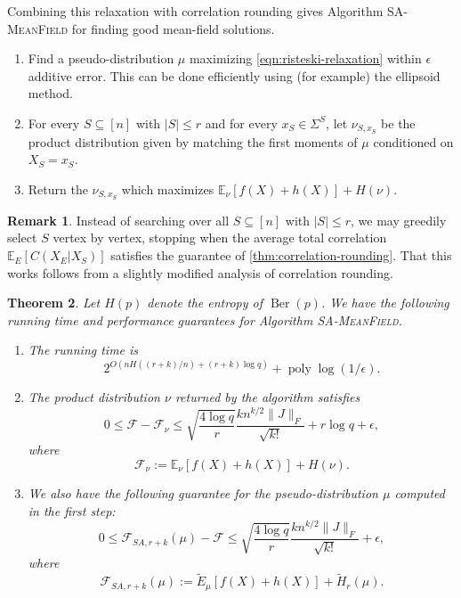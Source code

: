 \documentclass[11pt, oneside, english]{article}
\newcommand{\bE}{\mathbb{E}}
\newcommand{\F}{\mathcal{F}}
\newcommand{\E}{\bE}      %
\DeclareMathOperator{\Ber}{Ber}
\DeclareMathOperator{\poly}{poly}
\newtheorem{theorem}{Theorem}[section]
\theoremstyle{definition}
\newtheorem{remark}[theorem]{Remark}
\theoremstyle{plain}
\begin{document}
Combining this relaxation with correlation rounding gives Algorithm \textsc{SA-MeanField} for finding good mean-field solutions.
\begin{algorithm}
\caption{\textsc{SA-MeanField}}
\begin{enumerate}
\item Find a pseudo-distribution $\mu$ maximizing \cref{eqn:risteski-relaxation} within $\epsilon$ additive error. This can be done efficiently using (for example) the ellipsoid method.
\item For every $S \subseteq [n]$ with $|S| \le r$ and for every $x_S \in \Sigma^{S}$, let $\nu_{S,x_S}$ be the product distribution given by matching the first moments of $\mu$ conditioned on $X_S = x_S$.
\item Return the $\nu_{S,x_S}$ which maximizes $\E_{\nu}[f(X) + h(X)] + H(\nu)$.
\end{enumerate}
\end{algorithm}
\begin{remark}
Instead of searching over all $S\subseteq [n]$ with $|S|\leq r$, we may greedily select $S$ vertex by vertex, stopping when the average total correlation $\E_{E}[C(X_E | X_S)]$ satisfies the guarantee of \cref{thm:correlation-rounding}. That this works follows from a slightly modified analysis of correlation rounding.
\end{remark}
\begin{theorem}\label{thm:sa-meanfield}
Let $H(p)$ denote the entropy of $\Ber(p)$. We have the following running time and performance guarantees for Algorithm \textsc{SA-MeanField}. 
\begin{enumerate}
\item The running time is
\[ 2^{O(n H((r+k)/n) + (r+k) \log q)} + \poly\log(1/\epsilon).\]
\item The product distribution $\nu$ returned by the algorithm satisfies
\[ 0 \le \F - \F_{\nu} \le \sqrt{\frac{4\log{q}}{r}} \frac{k n^{k/2} \|J\|_F}{\sqrt{k!}} + r \log q + \epsilon, \]
where
\[ \F_{\nu} := \E_{\nu}[f(X) + h(X)] + H(\nu). \]
\item We also have the following guarantee for the pseudo-distribution $\mu$ computed in the first step:
\[ 0 \le \F_{SA, r + k}(\mu) - \F \le \sqrt{\frac{4\log{q}}{r}} \frac{k n^{k/2} \|J\|_F}{\sqrt{k!}} + \epsilon,\]
where
$$\F_{SA, r + k}(\mu) := \tilde{E}_\mu[f(X)+h(X)] + \tilde{H}_{r}(\mu).$$
\end{enumerate}

\end{theorem}
\end{document}
